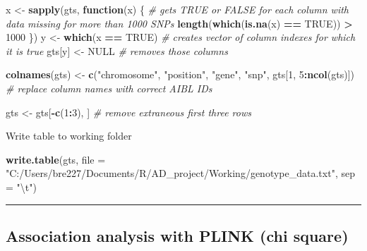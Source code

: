 \documentclass[]{article}
\newenvironment{Shaded}{\begin{snugshade}}{\end{snugshade}}
\newcommand{\KeywordTok}[1]{\textcolor[rgb]{0.13,0.29,0.53}{\textbf{#1}}}
\newcommand{\DataTypeTok}[1]{\textcolor[rgb]{0.13,0.29,0.53}{#1}}
\newcommand{\DecValTok}[1]{\textcolor[rgb]{0.00,0.00,0.81}{#1}}
\newcommand{\CharTok}[1]{\textcolor[rgb]{0.31,0.60,0.02}{#1}}
\newcommand{\StringTok}[1]{\textcolor[rgb]{0.31,0.60,0.02}{#1}}
\newcommand{\CommentTok}[1]{\textcolor[rgb]{0.56,0.35,0.01}{\textit{#1}}}
\newcommand{\OtherTok}[1]{\textcolor[rgb]{0.56,0.35,0.01}{#1}}
\newcommand{\ControlFlowTok}[1]{\textcolor[rgb]{0.13,0.29,0.53}{\textbf{#1}}}
\newcommand{\OperatorTok}[1]{\textcolor[rgb]{0.81,0.36,0.00}{\textbf{#1}}}
\newcommand{\NormalTok}[1]{#1}
\begin{document}
\begin{Shaded}
\begin{Highlighting}[]
\NormalTok{x <-}\StringTok{ }\KeywordTok{sapply}\NormalTok{(gts, }\ControlFlowTok{function}\NormalTok{(x) \{ }\CommentTok{# gets TRUE or FALSE for each column with data missing for more than 1000 SNPs}
  \KeywordTok{length}\NormalTok{(}\KeywordTok{which}\NormalTok{(}\KeywordTok{is.na}\NormalTok{(x) }\OperatorTok{==}\StringTok{ }\OtherTok{TRUE}\NormalTok{)) }\OperatorTok{>}\StringTok{ }\DecValTok{1000}
\NormalTok{\})}
\NormalTok{y <-}\StringTok{ }\KeywordTok{which}\NormalTok{(x }\OperatorTok{==}\StringTok{ }\OtherTok{TRUE}\NormalTok{) }\CommentTok{# creates vector of column indexes for which it is true}
\NormalTok{gts[y] <-}\StringTok{ }\OtherTok{NULL} \CommentTok{# removes those columns}

\KeywordTok{colnames}\NormalTok{(gts) <-}\StringTok{ }\KeywordTok{c}\NormalTok{(}\StringTok{"chromosome"}\NormalTok{, }\StringTok{"position"}\NormalTok{, }\StringTok{"gene"}\NormalTok{, }\StringTok{"snp"}\NormalTok{, gts[}\DecValTok{1}\NormalTok{, }\DecValTok{5}\OperatorTok{:}\KeywordTok{ncol}\NormalTok{(gts)]) }\CommentTok{# replace column names with correct AIBL IDs}

\NormalTok{gts <-}\StringTok{ }\NormalTok{gts[}\OperatorTok{-}\KeywordTok{c}\NormalTok{(}\DecValTok{1}\OperatorTok{:}\DecValTok{3}\NormalTok{), ] }\CommentTok{# remove extraneous first three rows}
\end{Highlighting}
\end{Shaded}

Write table to working folder

\begin{Shaded}
\begin{Highlighting}[]
\KeywordTok{write.table}\NormalTok{(gts, }\DataTypeTok{file =} \StringTok{"C:/Users/bre227/Documents/R/AD_project/Working/genotype_data.txt"}\NormalTok{, }\DataTypeTok{sep =} \StringTok{"}\CharTok{\textbackslash{}t}\StringTok{"}\NormalTok{)}
\end{Highlighting}
\end{Shaded}

\begin{center}\rule{0.5\linewidth}{\linethickness}\end{center}

\subsection{Association analysis with PLINK (chi
square)}\label{association-analysis-with-plink-chi-square}
\end{document}

